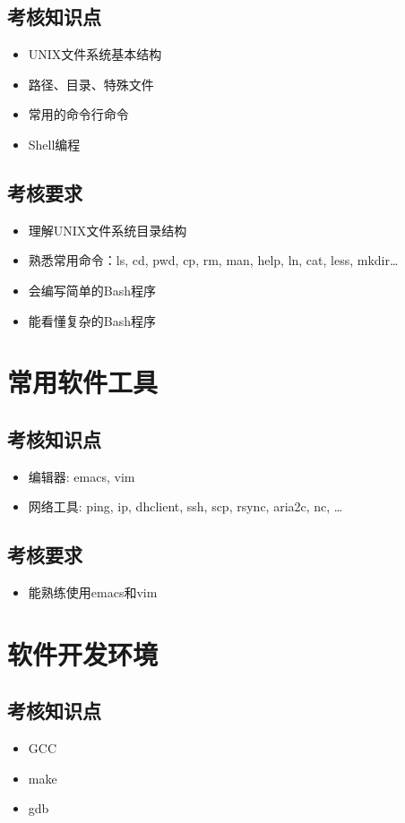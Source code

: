 \documentclass{wx672ctexart} \usepackage{wx672hyperref}
\begin{document}
\subsection{考核知识点}
\label{sec:org35598ca}
\begin{itemize}
\item UNIX文件系统基本结构
\item 路径、目录、特殊文件
\item 常用的命令行命令
\item Shell编程
\end{itemize}
\subsection{考核要求}
\label{sec:org11dc8a9}
\begin{itemize}
\item 理解UNIX文件系统目录结构
\item 熟悉常用命令：ls, cd, pwd, cp, rm, man, help, ln, cat, less, mkdir\ldots{}
\item 会编写简单的Bash程序
\item 能看懂复杂的Bash程序
\end{itemize}
\section{常用软件工具}
\label{sec:orga220e59}
\subsection{考核知识点}
\label{sec:orgfa57e1d}
\begin{itemize}
\item 编辑器: emacs, vim
\item 网络工具: ping, ip, dhclient, ssh, scp, rsync, aria2c, nc, \ldots{}
\end{itemize}
\subsection{考核要求}
\label{sec:orgca9cda3}
\begin{itemize}
\item 能熟练使用emacs和vim
\end{itemize}
\section{软件开发环境}
\label{sec:orgf240e21}
\subsection{考核知识点}
\label{sec:org0dce9ee}
\begin{itemize}
\item GCC
\item make
\item gdb
\end{itemize}
\end{document}
